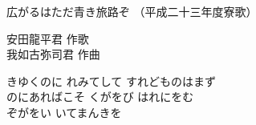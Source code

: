 \documentclass[10pt,b5j]{tarticle} %
\begin{document}
\begin{minipage}[c]{0.7\hsize} %
    \begin{center}
        {\LARGE
            広がるはただ青き旅路ぞ %
        }
        {\small 
            （平成二十三年度寮歌） %
        }
    \end{center}
\end{minipage}
\begin{minipage}[c]{0.3\hsize} %
    \begin{flushright} %
        安田龍平君 作歌\\我如古弥司君 作曲 %
    \end{flushright}
\end{minipage}

\vspace{1.5em} %
\newcommand{\linespace}{0.5em} %
\newcommand{\blocksize}{0.33\hsize} %
\newcommand{\itemmargin}{3em} %
\vspace{\linespace}
きゆくのに
れみてして
すれどものはまず\\
のにあればこそ
くがをび
はれにをむ\\
ぞがをい
いてまんきを
\end{document}
